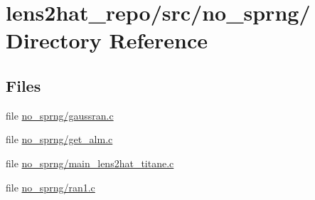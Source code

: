 \section{lens2hat\-\_\-repo/src/no\-\_\-sprng/ Directory Reference}
\label{dir_c065d4977ebcbdfd3146c4237da90c7e}
\subsection*{Files}
\begin{DoxyCompactItemize}
\item 
file \hyperlink{no__sprng_2gaussran_8c}{no\-\_\-sprng/gaussran.\-c}
\item 
file \hyperlink{no__sprng_2get__alm_8c}{no\-\_\-sprng/get\-\_\-alm.\-c}
\item 
file \hyperlink{no__sprng_2main__lens2hat__titane_8c}{no\-\_\-sprng/main\-\_\-lens2hat\-\_\-titane.\-c}
\item 
file \hyperlink{no__sprng_2ran1_8c}{no\-\_\-sprng/ran1.\-c}
\end{DoxyCompactItemize}
